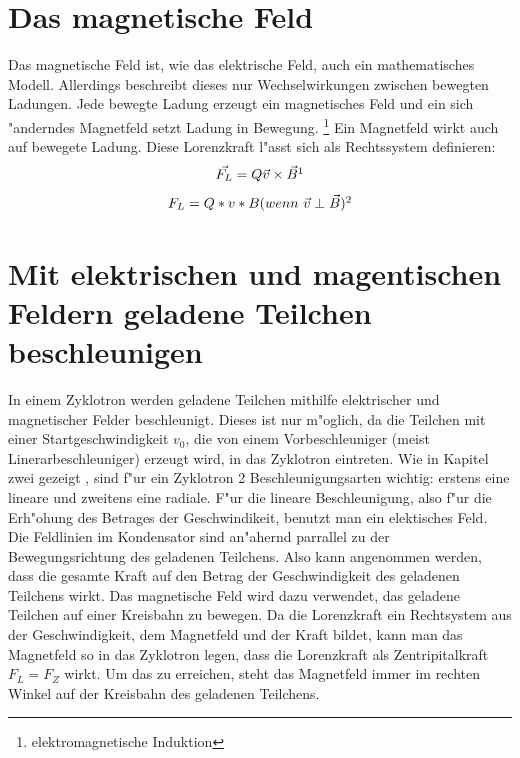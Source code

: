\documentclass[14pt, a4paper]{report}
\begin{document}
\section{Das magnetische Feld}
Das magnetische Feld ist, wie das elektrische Feld, auch ein mathematisches Modell.
Allerdings beschreibt dieses nur Wechselwirkungen zwischen bewegten Ladungen. Jede
bewegte Ladung erzeugt ein magnetisches Feld und ein sich "anderndes Magnetfeld 
setzt Ladung in Bewegung. \footnote{elektromagnetische Induktion}
Ein Magnetfeld wirkt auch auf bewegete Ladung. Diese Lorenzkraft l"asst sich als
Rechtssystem definieren:
\newpage
\begin{equation} \label{B-Feld-Gleichungen}
 \vec{F_L} = Q\vec{v} \times \vec{B} \footnotemark
\end{equation}
\begin{equation}
 F_L  = Q * v * B (wenn ~ \vec{v} \perp \vec{B}) \footnotemark
\end{equation}

 
\section{Mit elektrischen und magentischen Feldern geladene Teilchen beschleunigen}
In einem Zyklotron werden geladene Teilchen mithilfe elektrischer und magnetischer 
Felder beschleunigt. Dieses ist nur m"oglich, da die Teilchen mit einer
Startgeschwindigkeit $v_0$, die von einem Vorbeschleuniger (meist 
Linerarbeschleuniger) erzeugt wird, in das Zyklotron eintreten. Wie in Kapitel zwei
gezeigt 
,
sind f"ur ein Zyklotron 2 Beschleunigungsarten wichtig: erstens eine lineare und 
zweitens eine radiale. F"ur die lineare Beschleunigung, also f"ur die Erh"ohung des 
Betrages der Geschwindikeit, benutzt man ein elektisches Feld. Die Feldlinien im 
Kondensator sind an"ahernd parrallel zu der Bewegungsrichtung des geladenen Teilchens. 
Also kann angenommen werden, dass die gesamte Kraft auf den Betrag der Geschwindigkeit 
des geladenen Teilchens wirkt. Das magnetische Feld wird dazu verwendet, das geladene
Teilchen auf einer Kreisbahn zu bewegen. Da die Lorenzkraft ein Rechtsystem aus der
Geschwindigkeit, dem Magnetfeld und der Kraft bildet, kann man das Magnetfeld so
in das Zyklotron legen, dass die Lorenzkraft als Zentripitalkraft $F_L = F_Z$ wirkt.
Um das zu erreichen, steht das Magnetfeld immer im rechten Winkel auf der Kreisbahn
des geladenen Teilchens.
\end{document}
